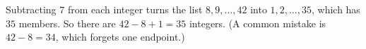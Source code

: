 Subtracting $7$ from each integer turns the list $8,9,\dots,42$ into $1,2,\dots,35$, which has $35$ members. So there are $42-8+1=\boxed{35}$ integers. (A common mistake is $42-8=34$, which forgets one endpoint.)
